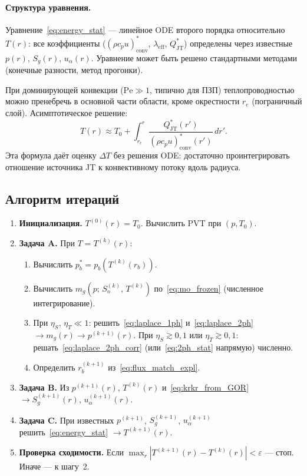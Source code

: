 ﻿\documentclass[12pt,a4paper]{article}
\begin{document}
\paragraph{Структура уравнения.}
Уравнение~\eqref{eq:energy_stat} --- линейное ODE
второго порядка относительно $T(r)$: все коэффициенты
($(\rho c_p u)_{\mathrm{conv}}^*$, $\lambda_{\mathrm{eff}}$,
$Q_{\mathrm{JT}}^*$) определены через известные $p(r)$,
$S_g(r)$, $u_\alpha(r)$. Уравнение может быть решено
стандартными методами (конечные разности, метод прогонки).

При доминирующей конвекции ($\mathrm{Pe} \gg 1$,
типично для ПЗП) теплопроводностью можно пренебречь
в основной части области, кроме окрестности $r_e$
(пограничный слой). Асимптотическое решение:
\begin{equation}\label{eq:T_convective}
  T(r) \approx T_0 + \int_{r_e}^{r}
  \frac{Q_{\mathrm{JT}}^*(r')}
  {(\rho c_p u)_{\mathrm{conv}}^*(r')}\,dr'.
\end{equation}
Эта формула даёт оценку $\Delta T$ без решения ODE:
достаточно проинтегрировать отношение источника JT
к конвективному потоку вдоль радиуса.

\subsection{Алгоритм итераций}\label{ssec:algorithm}

\begin{enumerate}[nosep]
  \item \textbf{Инициализация.}
        $T^{(0)}(r) = T_0$.
        Вычислить PVT при $(p, T_0)$.
  \item \textbf{Задача A.}
        При $T = T^{(k)}(r)$:
        \begin{enumerate}[nosep, label=(\alph*)]
          \item Вычислить $p_b^* = p_b(T^{(k)}(r_b))$.
          \item Вычислить $m_g(p;\,S_o^{(k)},\,T^{(k)})$
                по~\eqref{eq:mo_frozen}
                (численное интегрирование).
          \item При $\eta_S,\,\eta_T \ll 1$:
                решить~\eqref{eq:laplace_1ph}
                и~\eqref{eq:laplace_2ph}
                $\to m_g(r) \to p^{(k+1)}(r)$.
                При $\eta_S \gtrsim 0{,}1$
                или $\eta_T \gtrsim 0{,}1$:
                решать~\eqref{eq:laplace_2ph_corr}
                (или~\eqref{eq:2ph_stat} напрямую) численно.
          \item Определить $r_b^{(k+1)}$
                из~\eqref{eq:flux_match_expl}.
        \end{enumerate}
  \item \textbf{Задача B.}
        Из $p^{(k+1)}(r)$, $T^{(k)}(r)$
        и~\eqref{eq:krkr_from_GOR}
        $\to S_g^{(k+1)}(r)$, $u_\alpha^{(k+1)}(r)$.
  \item \textbf{Задача C.}
        При известных $p^{(k+1)}$, $S_g^{(k+1)}$,
        $u_\alpha^{(k+1)}$ решить~\eqref{eq:energy_stat}
        $\to T^{(k+1)}(r)$.
  \item \textbf{Проверка сходимости.}
        Если $\max_r |T^{(k+1)}(r) - T^{(k)}(r)| < \varepsilon$
        --- стоп. Иначе --- к шагу~2.
\end{enumerate}
\end{document}
